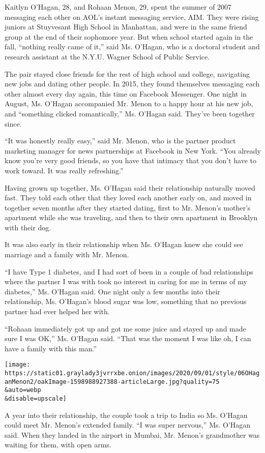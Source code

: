 Kaitlyn O'Hagan, 28, and Rohaan Menon, 29, spent the summer of 2007
messaging each other on AOL's instant messaging service, AIM. They were
rising juniors at Stuyvesant High School in Manhattan, and were in the
same friend group at the end of their sophomore year. But when school
started again in the fall, ``nothing really came of it,'' said Ms.
O'Hagan, who is a doctoral student and research assistant at the N.Y.U.
Wagner School of Public Service.

The pair stayed close friends for the rest of high school and college,
navigating new jobs and dating other people. In 2015, they found
themselves messaging each other almost every day again, this time on
Facebook Messenger. One night in August, Ms. O'Hagan accompanied Mr.
Menon to a happy hour at his new job, and ``something clicked
romantically,'' Ms. O'Hagan said. They've been together since.

``It was honestly really easy,'' said Mr. Menon, who is the partner
product marketing manager for news partnerships at Facebook in New York.
``You already know you're very good friends, so you have that intimacy
that you don't have to work toward. It was really refreshing.''

Having grown up together, Ms. O'Hagan said their relationship naturally
moved fast. They told each other that they loved each another early on,
and moved in together seven months after they started dating, first to
Mr. Menon's mother's apartment while she was traveling, and then to
their own apartment in Brooklyn with their dog.

It was also early in their relationship when Ms. O'Hagan knew she could
see marriage and a family with Mr. Menon.

``I have Type 1 diabetes, and I had sort of been in a couple of bad
relationships where the partner I was with took no interest in caring
for me in terms of my diabetes,'' Ms. O'Hagan said. One night only a few
months into their relationship, Ms. O'Hagan's blood sugar was low,
something that no previous partner had ever helped her with.

``Rohaan immediately got up and got me some juice and stayed up and made
sure I was OK,'' Ms. O'Hagan said. ``That was the moment I was like oh,
I can have a family with this man.''

\texttt{[image: https://static01.graylady3jvrrxbe.onion/images/2020/09/01/style/06OHaganMenon2/oakImage-1598988927388-articleLarge.jpg?quality=75\\\&auto=webp\\\&disable=upscale]}

A year into their relationship, the couple took a trip to India so Ms.
O'Hagan could meet Mr. Menon's extended family. ``I was super nervous,''
Ms. O'Hagan said. When they landed in the airport in Mumbai, Mr. Menon's
grandmother was waiting for them, with open arms.

